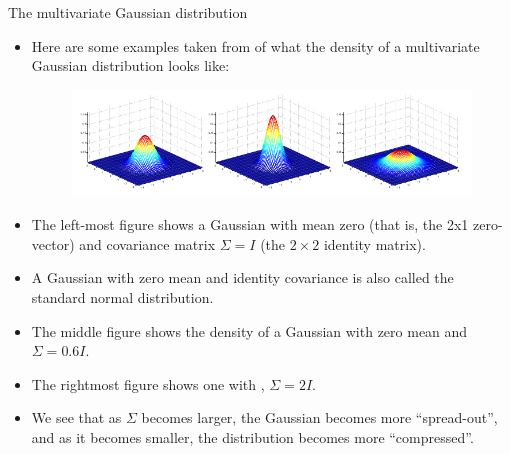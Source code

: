 \documentclass[handout]{beamer}
\begin{document}
\begin{frame}[fragile]{The multivariate Gaussian distribution}
\scriptsize{
\begin{itemize}
 
  \item Here are some examples taken from \cite{ng2008generative} of what the density of a multivariate Gaussian distribution looks like:
  
  \begin{figure}[h!]
	\centering
	\includegraphics[scale=0.4]{pics/mgaussian1.png}
\end{figure}


\item The left-most figure shows a Gaussian with mean zero (that is, the 2x1 zero-vector) and covariance matrix $\Sigma = I$ (the $2\times2$ identity matrix). 
\item A Gaussian with zero mean and identity covariance is also called the standard normal distribution.

\item The middle figure shows the density of a Gaussian with zero mean and $\Sigma = 0.6I$.

\item The rightmost figure shows one with , $\Sigma = 2I$.

\item We see that as $\Sigma$ becomes larger, the Gaussian becomes more ``spread-out'', and as it becomes smaller, the distribution becomes more ``compressed''.
 
\end{itemize}
 

 
}
\end{frame}
\end{document}
